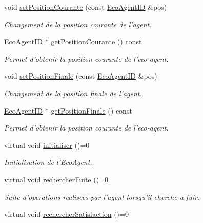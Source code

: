 \begin{CompactItemize}
void \hyperlink{classEcoAgent_0365707b7bc808dd45fb34d1c076f362}{setPositionCourante} (const \hyperlink{classEcoAgentID}{EcoAgentID} \&pos)
\begin{CompactList}\small\item\em Changement de la position courante de l'agent. \item\end{CompactList}\item 
\hyperlink{classEcoAgentID}{EcoAgentID} $\ast$ \hyperlink{classEcoAgent_01733b6103c367848cb4b8477cae5e51}{getPositionCourante} () const 
\begin{CompactList}\small\item\em Permet d'obtenir la position courante de l'eco-agent. \item\end{CompactList}\item 
void \hyperlink{classEcoAgent_a0ffbb1fdb23fb5d8ad188e8f16d8c50}{setPositionFinale} (const \hyperlink{classEcoAgentID}{EcoAgentID} \&pos)
\begin{CompactList}\small\item\em Changement de la position finale de l'agent. \item\end{CompactList}\item 
\hyperlink{classEcoAgentID}{EcoAgentID} $\ast$ \hyperlink{classEcoAgent_2b5ca918f5ca154c8109022f364c275d}{getPositionFinale} () const 
\begin{CompactList}\small\item\em Permet d'obtenir la position courante de l'eco-agent. \item\end{CompactList}\item 
virtual void \hyperlink{classEcoAgent_f779fd214bed010d0f6b7b137fde7116}{initialiser} ()=0
\begin{CompactList}\small\item\em Initialisation de l'EcoAgent. \item\end{CompactList}\item 
\hypertarget{classEcoAgent_4b20031a336e8497412e3f5df4155e28}{
virtual void \hyperlink{classEcoAgent_4b20031a336e8497412e3f5df4155e28}{rechercherFuite} ()=0}
\label{classEcoAgent_4b20031a336e8497412e3f5df4155e28}

\begin{CompactList}\small\item\em Suite d'operations realisees par l'agent lorsqu'il cherche a fuir. \item\end{CompactList}\item 
\hypertarget{classEcoAgent_77119c5004b4c7555ad5eca0197eb805}{
virtual void \hyperlink{classEcoAgent_77119c5004b4c7555ad5eca0197eb805}{rechercherSatisfaction} ()=0}
\label{classEcoAgent_77119c5004b4c7555ad5eca0197eb805}


\end{CompactItemize}

